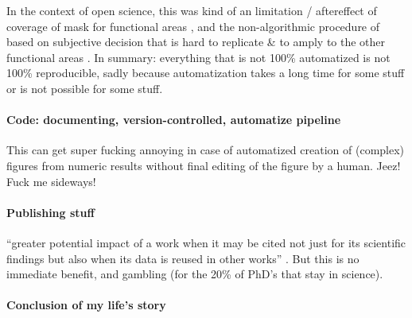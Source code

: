 %
In the context of open science, this was kind of an limitation / aftereffect of
coverage of mask for functional areas \citet{sengupta2016extension}, and the
non-algorithmic procedure of \citet{sengupta2016extension} based on subjective
decision that is hard to replicate \& to amply to the other functional areas
\citep[cf. algorithmic procedure in, e.g.,][]{julian2012algorithmic}.
%
In summary: everything that is not 100\% automatized is not 100\% reproducible,
sadly because automatization takes a long time for some stuff or is not possible
for some stuff.


\paragraph{Code: documenting, version-controlled, automatize pipeline}


%
This can get super fucking annoying in case of automatized creation of (complex)
figures from numeric results without final editing of the figure by a human.
Jeez! Fuck me sideways!



\paragraph{Publishing stuff}



%
``greater potential impact of a work when it may be cited not just for its
scientific findings but also when its data is reused in other works''
\citep{nichols2017best}.
%
But this is no immediate benefit, and gambling (for the 20\% of PhD's that stay
in science).


\paragraph{Conclusion of my life's story}

